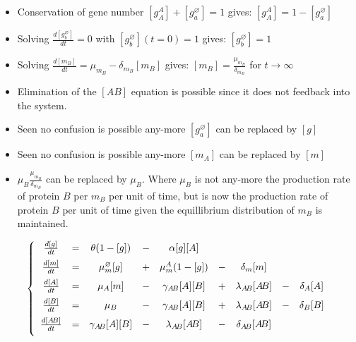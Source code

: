 \documentclass[12pt]{article}
\begin{document}
\begin{itemize}
\item Conservation of gene number $[g_A^A] + [g_a^\varnothing] = 1$ gives: $[g_A^A] = 1 - [g_a^\varnothing]$
\item Solving $\frac{d[g_b^\varnothing]}{dt}=0$ with $[g_b^\varnothing](t=0)=1$ gives: $[g_b^\varnothing]=1$
\item Solving $\frac{d[m_B]}{dt}=\mu_{m_B}-\delta_{m_B} [m_B]$ gives: $[m_B] = \frac{\mu_{m_B}}{\delta_{m_B}}$ for $t\rightarrow\infty$
\item Elimination of the $[A\! B]$ equation is possible since it does not feedback into the system.
\item Seen no confusion is possible any-more $[g_a^\varnothing]$ can be replaced by $[g]$
\item Seen no confusion is possible any-more $[m_A]$ can be replaced by $[m]$
\item $\mu_{B}\frac{\mu_{m_B}}{\delta_{m_B}}$ can be replaced by $\mu_{B}$. Where $\mu_{B}$ is not any-more the production rate of protein $B$ per $m_{B}$ per unit of time, but is now the production rate of protein $B$ per unit of time given the equillibrium distribution of $m_{B}$ is maintained.
\end{itemize}

\begin{eqnarray}
\left\{ 
\begin{array}{ccccccccc}
\vspace{2mm}
\frac{d[g]}{dt}     &=&\theta (1-[g])             &-&\alpha [g] [A]                                                      \\
\vspace{2mm}
\frac{d[m]}{dt}     &=&\mu_m^\varnothing[g]       &+&\mu_m^A(1-[g])          &-&\delta_m[m  ]                            \\
\vspace{2mm}
\frac{d[A]}{dt}     &=&\mu_A [m]                  &-&\gamma_{A\! B} [A][B]   &+&\lambda_{A\! B} [A\! B] &-& \delta_A [A] \\
\vspace{2mm}
\frac{d[B]}{dt}     &=&\mu_B                      &-&\gamma_{A\! B} [A][B]   &+&\lambda_{A\! B} [A\! B] &-& \delta_B [B] \\
\vspace{2mm}
\frac{d[A\! B]}{dt} &=&\gamma_{A\! B} [A][B]      &-&\lambda_{A\! B} [A\! B] &-&\delta_{A\! B} [A\! B]
\end{array}
\right.
\end{eqnarray}
\end{document}
